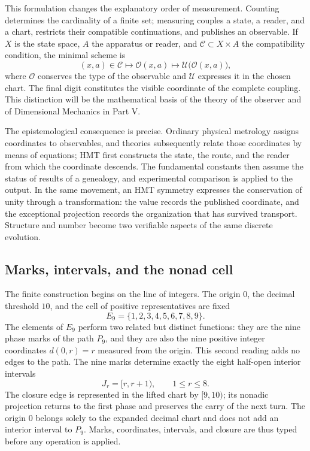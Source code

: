 This formulation changes the explanatory order of measurement. Counting determines the cardinality of a finite set; measuring couples a state, a reader, and a chart, restricts their compatible continuations, and publishes an observable. If \(X\) is the state space, \(A\) the apparatus or reader, and \(\mathcal C\subset X\times A\) the compatibility condition, the minimal scheme is
\[
 (x,a)\in\mathcal C
 \longmapsto \mathcal O(x,a)
 \longmapsto \mathcal U\bigl(\mathcal O(x,a)\bigr),
\]
where \(\mathcal O\) conserves the type of the observable and \(\mathcal U\)
expresses it in the chosen chart. The final digit constitutes the visible coordinate
of the complete coupling. This distinction will be the mathematical basis of the
theory of the observer and of Dimensional Mechanics in Part V.

The epistemological consequence is precise. Ordinary physical metrology assigns coordinates to observables, and theories subsequently relate those coordinates by means of equations; HMT first constructs the state, the route, and the reader from which the coordinate descends. The fundamental constants then assume the status of results of a genealogy, and experimental comparison is applied to the output. In the same movement, an HMT symmetry expresses the conservation of unity through a transformation: the value records the published coordinate, and the exceptional projection records the organization that has survived transport. Structure and number become two verifiable aspects of the same discrete evolution.

\subsection{Marks, intervals, and the nonad cell}

The finite construction begins on the line of integers. The
origin \(0\), the decimal threshold \(10\), and the cell of positive
representatives are fixed
\[
 E_9=\{1,2,3,4,5,6,7,8,9\}.
\]
The elements of \(E_9\) perform two related but distinct functions: they are the nine phase marks of the path \(P_9\), and they are also the nine positive integer coordinates \(d(0,r)=r\) measured from the origin. This second reading adds no edges to the path. The nine marks determine exactly the eight half-open interior intervals
\[
 J_r=[r,r+1),\qquad 1\le r\le8.
\]
The closure edge is represented in the lifted chart by \([9,10)\); its nonadic projection returns to the first phase and preserves the carry of the next turn. The origin \(0\) belongs solely to the expanded decimal chart and does not add an interior interval to \(P_9\). Marks, coordinates, intervals, and closure are thus typed before any operation is applied.

